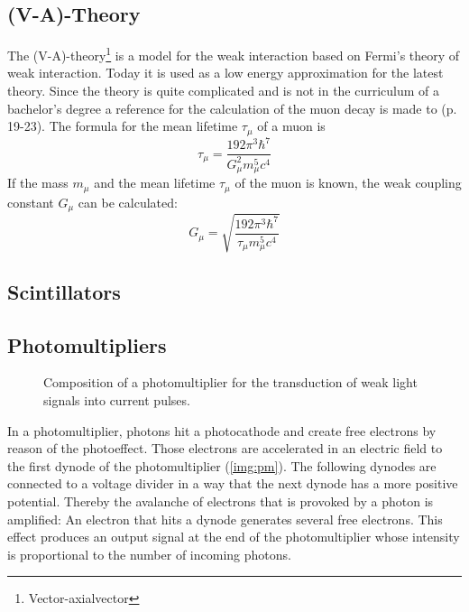 \subsection{(V-A)-Theory}
The (V-A)-theory\footnote{Vector-axialvector} is a model for the weak interaction based on Fermi's theory of weak interaction. Today it is 
used as a low energy approximation for the latest theory. Since the theory is quite complicated and is not in the curriculum of a bachelor's 
degree a reference for the calculation of the muon decay is made to \cite{staatsex} (p. 19-23). The formula for the mean lifetime $\tau_\mu$ of a muon is
\begin{equation}
    \tau_\mu = \frac{192 \pi^3 \hbar^7}{G_\mu^2 m_\mu^5 c^4}
\end{equation}
If the mass $m_\mu$ and the mean lifetime $\tau_\mu$ of the muon is known, the weak coupling constant $G_\mu$ can be calculated:
\begin{equation}
    \label{eq:weakcouplingconstant}
    G_\mu = \sqrt{\frac{192 \pi^3 \hbar^7}{\tau_\mu m_\mu^5 c^4}}
\end{equation}


\subsection{Scintillators}


\subsection{Photomultipliers}

\begin{figure}[H]
        \centering
        \def\svgwidth{0.7\textwidth}
       
        \caption{Composition of a photomultiplier for the transduction of weak light signals into current pulses.}
        \label{img:pm}
\end{figure}

In a photomultiplier, photons hit a photocathode and create free electrons by reason of the photoeffect.
Those electrons are accelerated in an electric field to the first dynode of the photomultiplier (\autoref{img:pm}).
The following dynodes are connected to a voltage divider in a way that the next dynode has a more positive potential.
Thereby the avalanche of electrons that is provoked by a photon is amplified:
An electron that hits a dynode generates several free electrons.
This effect produces an output signal at the end of the photomultiplier whose intensity is proportional
to the number of incoming photons.
 






